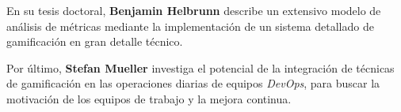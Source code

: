 \documentclass[journal]{IEEEtran}
\begin{document}
\cite{heilbrunn2014towards} En su tesis doctoral, \textbf{Benjamin Helbrunn} describe un extensivo modelo de análisis de métricas mediante la implementación de un sistema detallado de gamificación en gran detalle técnico.

\cite{mueller2024leveraging} Por último, \textbf{Stefan Mueller} investiga el potencial de la integración de técnicas de gamificación en las operaciones diarias de equipos \textit{DevOps}, para buscar la motivación de los equipos de trabajo y la mejora continua.



\end{document}

